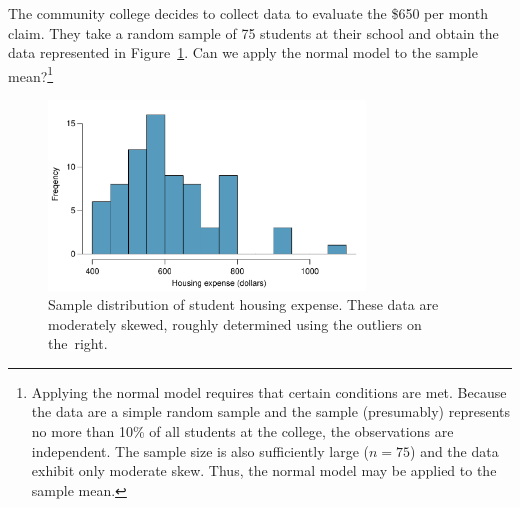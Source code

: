 \begin{exercise} \label{normalDistCondForHousingExpenseForCommunityCollege650}
The community college decides to collect data to evaluate the \$650 per month claim. They take a random sample of 75 students at their school and obtain the data represented in Figure~\ref{communityCollegeClaimedHousingExpenseDistribution}. Can we apply the normal model to the sample mean?\footnote{Applying the normal model requires that certain conditions are met. Because the data are a simple random sample and the sample (presumably) represents no more than 10\% of all students at the college, the observations are independent. The sample size is also sufficiently large ($n=75$) and the data exhibit only moderate skew. Thus, the normal model may be applied to the sample mean.}

\begin{figure}[H]
\centering
\includegraphics[width=0.75\textwidth]{04/figures/communityCollegeClaimedHousingExpenseDistribution/communityCollegeClaimedHousingExpenseDistribution}
\captionsetup{width=0.9\textwidth}
\caption{Sample distribution of student housing expense. These data are moderately skewed, roughly determined using the outliers on the~right.}
\label{communityCollegeClaimedHousingExpenseDistribution}
\end{figure}
\end{exercise}



